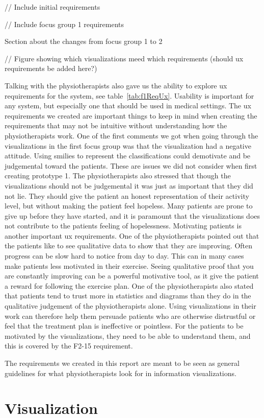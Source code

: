// Include initial requirements

// Include focus group 1 requirements

Section about the changes from focus group 1 to 2

// Figure showing which visualizations meed which requirements (should ux requirements be added here?)

Talking with the physiotherapists also gave us the ability to explore \gls{ux} requirements for the system, see table~\ref{tab:f1ReqUx}. Usability is important for any system, but especially one that should be used in medical settings. %
The \gls{ux} requirements we created are important things to keep in mind when creating the requirements that may not be intuitive without understanding how the physiotherapists work. One of the first comments we got when going through the visualizations in the first focus group was that the visualization had a negative attitude. Using smilies to represent the classifications could demotivate and be judgemental toward the patients. These are issues we did not consider when first creating prototype 1. The physiotherapists also stressed that though the visualizations should not be judgemental it was just as important that they did not lie. They should give the patient an honest representation of their activity level, but without making the patient feel hopeless. Many patients are prone to give up before they have started, and it is paramount that the visualizations does not contribute to the patients feeling of hopelessness. Motivating patients is another important \gls{ux} requirements. One of the physiotherapists pointed out that the patients like to see qualitative data to show that they are improving. Often progress can be slow hard to notice from day to day. This can in many cases make patients less motivated in their exercise. Seeing qualitative proof that you are constantly improving can be a powerful motivative tool, as it give the patient a reward for following the exercise plan. One of the physiotherapists also stated that patients tend to trust more in statistics and diagrams than they do in the qualitative judgement of the physiotherapists alone. Using visualizations in their work can therefore help them persuade patients who are otherwise distrustful or feel that the treatment plan is ineffective or pointless. For the patients to be motivated by the visualizations, they need to be able to understand them, and this is covered by the F2-15 requirement. 

The requirements we created in this report are meant to be seen as general guidelines for what physiotherapists look for in information visualizations. 

\section{Visualization}
